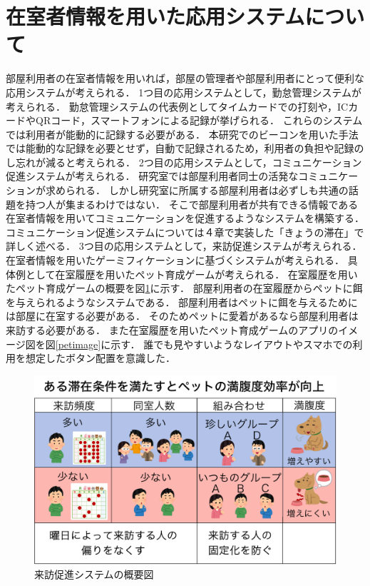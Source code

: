 
\section{在室者情報を用いた応用システムについて}\label{3.4}
部屋利用者の在室者情報を用いれば，部屋の管理者や部屋利用者にとって便利な応用システムが考えられる．
1つ目の応用システムとして，勤怠管理システムが考えられる．
勤怠管理システムの代表例としてタイムカードでの打刻や，ICカードやQRコード，スマートフォンによる記録が挙げられる．
これらのシステムでは利用者が能動的に記録する必要がある．
本研究でのビーコンを用いた手法では能動的な記録を必要とせず，自動で記録されるため，利用者の負担や記録のし忘れが減ると考えられる．
2つ目の応用システムとして，コミュニケーション促進システムが考えられる．
研究室では部屋利用者同士の活発なコミュニケーションが求められる．
しかし研究室に所属する部屋利用者は必ずしも共通の話題を持つ人が集まるわけではない．
そこで部屋利用者が共有できる情報である在室者情報を用いてコミュニケーションを促進するようなシステムを構築する．
コミュニケーション促進システムについては４章で実装した「きょうの滞在」で詳しく述べる．
3つ目の応用システムとして，来訪促進システムが考えられる．
在室者情報を用いたゲーミフィケーションに基づくシステムが考えられる．
具体例として在室履歴を用いたペット育成ゲームが考えられる．
在室履歴を用いたペット育成ゲームの概要を図\ref{petgaiyou}に示す．
部屋利用者の在室履歴からペットに餌を与えられるようなシステムである．
部屋利用者はペットに餌を与えるためには部屋に在室する必要がある．
そのためペットに愛着があるなら部屋利用者は来訪する必要がある．
また在室履歴を用いたペット育成ゲームのアプリのイメージ図を図\ref{petimage}に示す．
誰でも見やすいようなレイアウトやスマホでの利用を想定したボタン配置を意識した．
\begin{figure}[H]
  \begin{center}
    \includegraphics[width=160mm]{image/petgaiyou.pdf}
    \caption{来訪促進システムの概要図}
    \label{petgaiyou}
  \end{center}
\end{figure}

